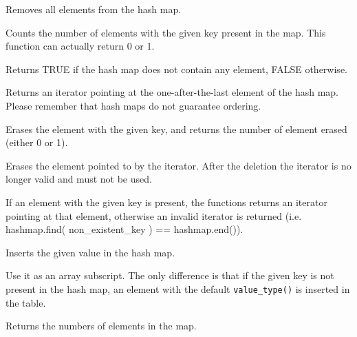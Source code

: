 Removes all elements from the hash map.



Counts the number of elements with the given key present in the map.
This function can actually return 0 or 1.



Returns TRUE if the hash map does not contain any element, FALSE otherwise.




Returns an iterator pointing at the one-after-the-last element of the hash map.
Please remember that hash maps do not guarantee ordering.



Erases the element with the given key, and returns the number of element
erased (either 0 or 1).



Erases the element pointed to by the iterator. After the deletion
the iterator is no longer valid and must not be used.




If an element with the given key is present, the functions returns
an iterator pointing at that element, otherwise an invalid iterator
is returned (i.e. hashmap.find( non\_existent\_key ) == hashmap.end()).



Inserts the given value in the hash map.



Use it as an array subscript. The only difference is that if the
given key is not present in the hash map, an element with the
default {\tt value\_type()} is inserted in the table.



Returns the numbers of elements in the map.

